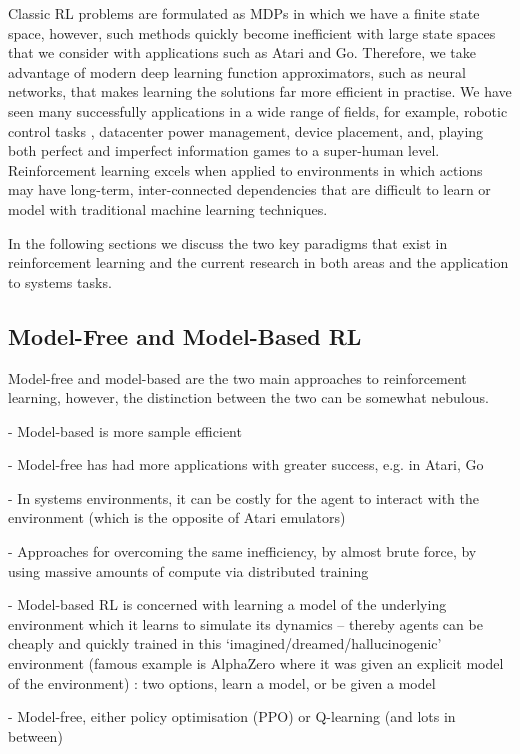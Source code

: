 Classic RL problems are formulated as MDPs in which we have a finite state space, however, such methods quickly become inefficient with large state spaces that we consider with applications such as Atari and Go. Therefore, we take advantage of modern deep learning function approximators, such as neural networks, that makes learning the solutions far more efficient in practise. We have seen many successfully applications in a wide range of fields, for example, robotic control tasks \cite{openai2019solving}, datacenter power management, device placement, and, playing both perfect and imperfect information games to a super-human level. Reinforcement learning excels when applied to environments in which actions may have long-term, inter-connected dependencies that are difficult to learn or model with traditional machine learning techniques.

In the following sections we discuss the two key paradigms that exist in reinforcement learning and the current research in both areas and the application to systems tasks.

\subsection{Model-Free and Model-Based RL}

Model-free and model-based are the two main approaches to reinforcement learning, however, the distinction between the two can be somewhat nebulous.

- Model-based is more sample efficient

- Model-free has had more applications with greater success, e.g. in Atari, Go

- In systems environments, it can be costly for the agent to interact with the environment (which is the opposite of Atari emulators)

- Approaches for overcoming the same inefficiency, by almost brute force, by using massive amounts of compute via distributed training

- Model-based RL is concerned with learning a model of the underlying environment which it learns to simulate its dynamics -- thereby agents can be cheaply and quickly trained in this `imagined/dreamed/hallucinogenic' environment (famous example is AlphaZero where it was given an explicit model of the environment) : two options, learn a model, or be given a model

- Model-free, either policy optimisation (PPO) or Q-learning (and lots in between)

